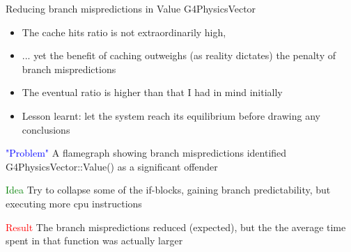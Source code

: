 \documentclass{beamer}
\begin{document}

\begin{frame}{Reducing branch mispredictions in Value G4PhysicsVector}
\begin{itemize}
\item The cache hits ratio is not extraordinarily high,
\item ... yet the benefit of caching outweighs (as reality dictates) the penalty of
branch mispredictions
\item The eventual ratio is higher than that I had in mind initially
\item Lesson learnt: let the system reach its equilibrium before drawing any conclusions
\end{itemize}
\end{frame}

\begin{frame}

\textcolor{blue}{"Problem"} A flamegraph showing branch mispredictions identified
G4PhysicsVector::Value() as a significant offender

\vspace{5mm}

\textcolor{green}{Idea} Try to collapse some of the if-blocks, gaining branch
predictability, but executing more cpu instructions

\vspace{5mm}

\textcolor{red}{Result} The branch mispredictions reduced (expected), but the
the average time spent in that function was actually larger

\end{frame}
\end{document}
